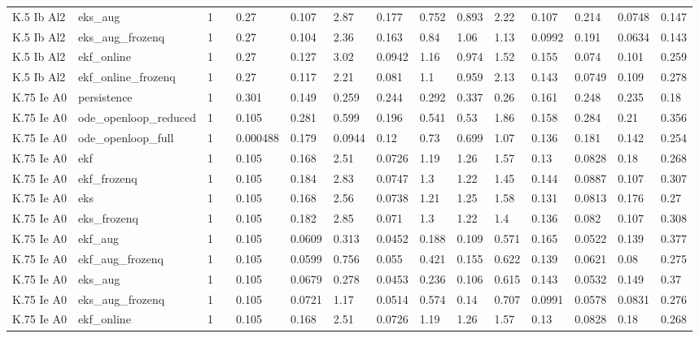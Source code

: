 \begin{table}[t]
\begin{tabular}{lllllllllllllll}
K.5 Ib Al2 & eks\_aug & 1 &  & 0.27 & 0.107 & 2.87 & 0.177 & 0.752 & 0.893 & 2.22 & 0.107 & 0.214 & 0.0748 & 0.147 \\
K.5 Ib Al2 & eks\_aug\_frozenq & 1 &  & 0.27 & 0.104 & 2.36 & 0.163 & 0.84 & 1.06 & 1.13 & 0.0992 & 0.191 & 0.0634 & 0.143 \\
K.5 Ib Al2 & ekf\_online & 1 &  & 0.27 & 0.127 & 3.02 & 0.0942 & 1.16 & 0.974 & 1.52 & 0.155 & 0.074 & 0.101 & 0.259 \\
K.5 Ib Al2 & ekf\_online\_frozenq & 1 &  & 0.27 & 0.117 & 2.21 & 0.081 & 1.1 & 0.959 & 2.13 & 0.143 & 0.0749 & 0.109 & 0.278 \\
K.75 Ie A0 & persistence & 1 &  & 0.301 & 0.149 & 0.259 & 0.244 & 0.292 & 0.337 & 0.26 & 0.161 & 0.248 & 0.235 & 0.18 \\
K.75 Ie A0 & ode\_openloop\_reduced & 1 &  & 0.105 & 0.281 & 0.599 & 0.196 & 0.541 & 0.53 & 1.86 & 0.158 & 0.284 & 0.21 & 0.356 \\
K.75 Ie A0 & ode\_openloop\_full & 1 &  & 0.000488 & 0.179 & 0.0944 & 0.12 & 0.73 & 0.699 & 1.07 & 0.136 & 0.181 & 0.142 & 0.254 \\
K.75 Ie A0 & ekf & 1 &  & 0.105 & 0.168 & 2.51 & 0.0726 & 1.19 & 1.26 & 1.57 & 0.13 & 0.0828 & 0.18 & 0.268 \\
K.75 Ie A0 & ekf\_frozenq & 1 &  & 0.105 & 0.184 & 2.83 & 0.0747 & 1.3 & 1.22 & 1.45 & 0.144 & 0.0887 & 0.107 & 0.307 \\
K.75 Ie A0 & eks & 1 &  & 0.105 & 0.168 & 2.56 & 0.0738 & 1.21 & 1.25 & 1.58 & 0.131 & 0.0813 & 0.176 & 0.27 \\
K.75 Ie A0 & eks\_frozenq & 1 &  & 0.105 & 0.182 & 2.85 & 0.071 & 1.3 & 1.22 & 1.4 & 0.136 & 0.082 & 0.107 & 0.308 \\
K.75 Ie A0 & ekf\_aug & 1 &  & 0.105 & 0.0609 & 0.313 & 0.0452 & 0.188 & 0.109 & 0.571 & 0.165 & 0.0522 & 0.139 & 0.377 \\
K.75 Ie A0 & ekf\_aug\_frozenq & 1 &  & 0.105 & 0.0599 & 0.756 & 0.055 & 0.421 & 0.155 & 0.622 & 0.139 & 0.0621 & 0.08 & 0.275 \\
K.75 Ie A0 & eks\_aug & 1 &  & 0.105 & 0.0679 & 0.278 & 0.0453 & 0.236 & 0.106 & 0.615 & 0.143 & 0.0532 & 0.149 & 0.37 \\
K.75 Ie A0 & eks\_aug\_frozenq & 1 &  & 0.105 & 0.0721 & 1.17 & 0.0514 & 0.574 & 0.14 & 0.707 & 0.0991 & 0.0578 & 0.0831 & 0.276 \\
K.75 Ie A0 & ekf\_online & 1 &  & 0.105 & 0.168 & 2.51 & 0.0726 & 1.19 & 1.26 & 1.57 & 0.13 & 0.0828 & 0.18 & 0.268 \\

\end{tabular}
\end{table}
